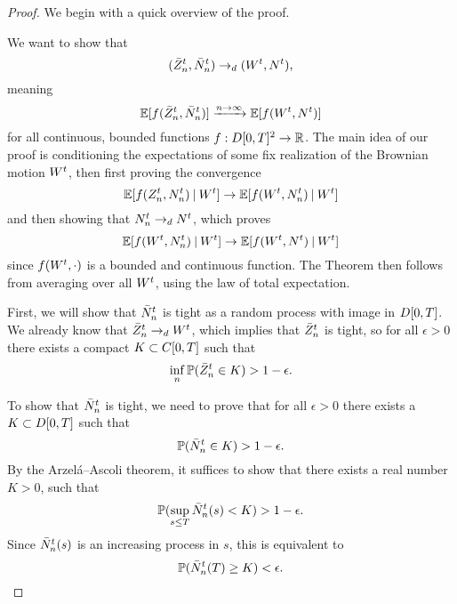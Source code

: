 \begin{proof}

We begin with a quick overview of the proof.

We want to show that
\begin{equation}
(\bar{Z}^t_n, \bar{N}_n^t) \rightarrow_d (W^t, N^t),
\end{equation}
meaning 
\begin{equation}
\mathbb{E}[f(\bar{Z}^t_n, \bar{N}_n^t)] \xrightarrow{n \rightarrow \infty} \mathbb{E}[f(W^t, N^t)]
\end{equation}
for all continuous, bounded functions $f:D[0,T]^2\rightarrow\mathbb{R}$.
The main idea of our proof is conditioning the expectations of some fix realization of the Brownian motion $W^t$,
then first proving the convergence
\begin{equation}
	\mathbb{E}[f(Z_n^t, N_n^t) \: | \: W^t] \rightarrow \mathbb{E}[f(W^t, N_n^t) \: | \: W^t]
\end{equation}
and then showing that $N_n^t \rightarrow_d N^t$,
which proves
\begin{equation}
	\mathbb{E}[f(W^t, N_n^t) \: | \: W^t] \rightarrow \mathbb{E}[f(W^t, N^t ) \: | \: W^t]
\end{equation}
since $f(W^t, \cdot)$ is a bounded and continuous function.
The Theorem then follows from averaging over all $W^t$, using the law of total expectation.

First, we will show that $\bar{N}_n^t$ is tight as a random process with image in $D[0, T]$.
We already know that $\bar{Z}^t_n \rightarrow_d W^t$, which implies that $\bar{Z}^t_n$ is tight, 
so for all $\epsilon>0$ there exists a compact $K \subset C[0, T]$ such that
\begin{equation}
\inf_n \mathbb{P} ( \bar{Z}^t_n \in K) > 1 - \epsilon.
\end{equation}

To show that $\bar{N}_n^t$ is tight, we need to prove that for all $\epsilon>0$ there exists a $K \subset D[0, T]$ such that
\begin{equation}
	\mathbb{P}(\bar{N}_n^t \in K) > 1 - \epsilon.
\end{equation}
By the Arzelá–Ascoli theorem, it suffices to show that there exists a real number $K>0$, such that
\begin{equation}
	\mathbb{P}( \sup_{s \leq T} \bar{N}_n^t(s) < K ) > 1 - \epsilon. 
\end{equation}
Since $\bar{N}_n^t(s)$ is an increasing process in $s$, this is equivalent to
\begin{equation}
	\mathbb{P}( \bar{N}_n^t(T) \geq K ) < \epsilon.
\end{equation}


\end{proof}
